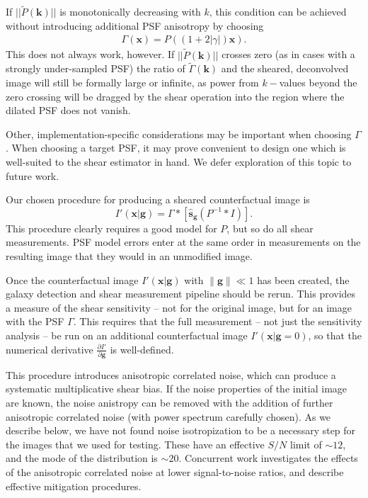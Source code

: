 \documentclass[iop]{emulateapj}
\begin{document}
If $||\tilde{P}(\mathbf{k})||$ is monotonically decreasing with $k$,
this condition can be achieved without introducing additional PSF
anisotropy by choosing
\begin{align}
\Gamma(\mathbf{x}) = P\left((1+2|\gamma|)\mathbf{x}\right).
\end{align}
This does not always work, however. If $||\tilde{P}(\mathbf{k})||$
crosses zero (as in cases with a strongly under-sampled PSF) the
ratio of $\tilde{\Gamma}(\mathbf{k})$ and the sheared, deconvolved
image will still be formally large or infinite, as power from
$k-$values beyond the zero crossing will be dragged by the shear
operation into the region where the dilated PSF does not vanish.

Other, implementation-specific considerations may be important when
choosing $\Gamma$. When choosing a target PSF, it may prove convenient
to design one which is well-suited to the shear estimator in hand. We
defer exploration of this topic to future work.

Our chosen procedure for producing a sheared counterfactual image is
\begin{equation}
I'({\mathbf{x}}|\mathbf{g}) = \Gamma \ast \left[\hat{\mathbf{s}}_\mathbf{g} \left(P^{-1} \ast I \right)\right].
\end{equation}
This procedure clearly requires a good model for $P$, but so do all
shear measurements. PSF model errors enter at the
same order in measurements on the resulting image that they would in
an unmodified image.

Once the counterfactual image $I'(\mathbf{x}|\mathbf{g})$ with
$\|\mathbf{g}\| \ll 1$ has been created, the galaxy detection and
shear measurement pipeline should be rerun. This provides a measure of
the shear sensitivity -- not for the original image, but for an image
with the PSF $\Gamma$. This requires that the full measurement -- not
just the sensitivity analysis -- be run on an additional
counterfactual image $I'(\mathbf{x}|\mathbf{g}=0)$, so that the numerical
derivative $\frac{\partial I'}{\partial \mathbf{g}}$ is well-defined.

This procedure introduces anisotropic correlated noise, which can
produce a systematic multiplicative shear bias. If the noise
properties of the initial image are known, the noise anistropy can be
removed with the addition of further anisotropic correlated noise
(with power spectrum carefully chosen). As we describe below, we have
not found noise isotropization to be a necessary step for the images
that we used for testing.  These have an effective $S/N$ limit of
$\sim 12$, and the mode of the distribution is $\sim20$. Concurrent
work \citep{metacalII} investigates the effects of the anisotropic
correlated noise at lower signal-to-noise ratios, and describe
effective mitigation procedures.
\end{document}
